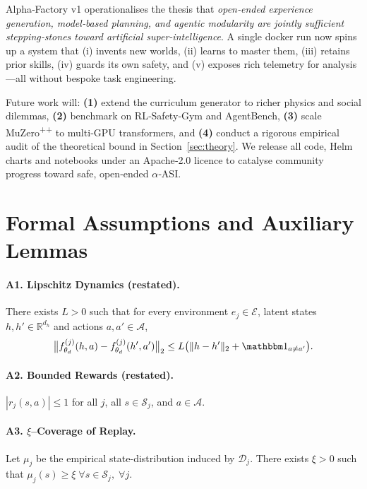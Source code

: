 Alpha‑Factory v1 operationalises the thesis that \emph{open‑ended
experience generation, model‑based planning, and agentic modularity are
jointly sufficient stepping‑stones toward artificial super‑intelligence}.
A single docker run now spins up a system that
(i) invents new worlds, (ii) learns to master them, (iii) retains prior
skills, (iv) guards its own safety, and (v) exposes rich telemetry for
analysis---all without bespoke task engineering.

Future work will: \textbf{(1)} extend the curriculum generator to richer
physics and social dilemmas, \textbf{(2)} benchmark on RL‑Safety‑Gym and
AgentBench, \textbf{(3)} scale MuZero\textsuperscript{++} to multi‑GPU
transformers, and \textbf{(4)} conduct a rigorous empirical audit of the
theoretical bound in Section~\ref{sec:theory}.
We release all code, Helm charts and notebooks under an Apache‑2.0 licence
to catalyse community progress toward safe, open‑ended $\alpha$‑ASI.

\appendix
\section{Formal Assumptions and Auxiliary Lemmas}\label{app:assumptions}

\paragraph{A1. Lipschitz Dynamics (restated).}
There exists $L>0$ such that for every environment
$e_j\!\in\!\mathcal E$, latent states $h,h'\!\in\!\mathbb R^{d_h}$ and
actions $a,a'\!\in\!\mathcal A$,
\[
\bigl\lVert
  f_{\theta_d}^{(j)}(h,a)-f_{\theta_d}^{(j)}(h',a')
\bigr\rVert_2
\le
L\bigl(\lVert h-h'\rVert_2+\mathbbm1_{a\neq a'}\bigr).
\]

\paragraph{A2. Bounded Rewards (restated).}
$|r_j(s,a)|\le 1$ for all $j$, all $s\!\in\!\mathcal S_j$, and
$a\!\in\!\mathcal A$.

\paragraph{A3. $\xi$–Coverage of Replay.}
Let $\mu_j$ be the empirical state-distribution induced by $\mathcal D_j$.
There exists $\xi>0$ such that
$\mu_j(s)\ge\xi\;\forall s\!\in\!\mathcal S_j,\; \forall j$.

